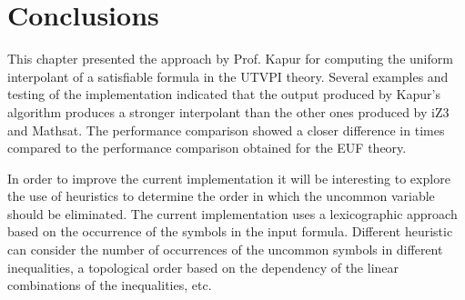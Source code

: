 \section{Conclusions}

This chapter presented the approach
by Prof. Kapur for computing
the uniform interpolant of a satisfiable
formula in the UTVPI theory.
Several examples and testing of the implementation
indicated that the output produced by Kapur's
algorithm produces a stronger interpolant 
than the other ones produced by iZ3 and Mathsat.
The performance comparison showed a closer
difference in times compared to the performance 
comparison obtained for the EUF theory. 

In order to improve the current implementation it
will be interesting to explore the use of heuristics to 
determine the order in which the uncommon variable 
should be eliminated. The current implementation uses
a lexicographic approach based on the occurrence of the
symbols in the input formula. Different heuristic
can consider the number of occurrences of the uncommon
symbols in different inequalities, a topological order
based on the dependency of the linear combinations of
the inequalities, etc. 


